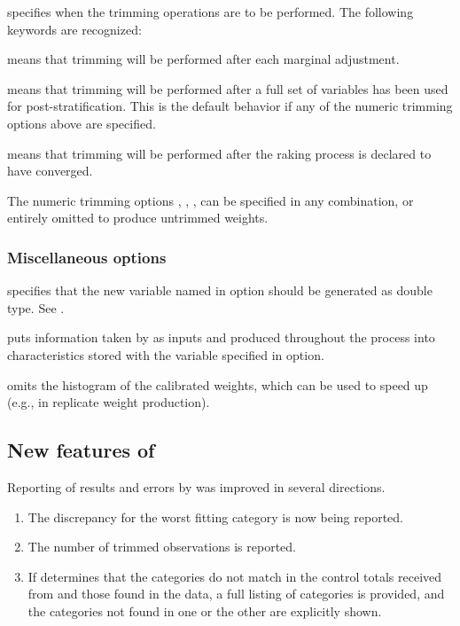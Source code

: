 \hangpara
{} specifies when the trimming operations
    are to be performed. The following keywords are recognized:

\morehang {} means that trimming will be performed
    after each marginal adjustment.

\morehang {} means that trimming will be performed
    after a full set of variables has been used for post-stratification.
    This is the default behavior if any of the numeric trimming
    options above are specified.

\morehang {}
    means that trimming will be performed after the raking process
    is declared to have converged.

The numeric trimming options , ,
,  can be specified in any combination,
or entirely omitted to produce untrimmed weights.

\subsubsection{Miscellaneous options}

\hangpara
{} specifies that the new variable named in 
option should be generated as double type. See .

\hangpara
{} puts information taken by  as inputs and produced
    throughout the process into characteristics stored with the variable specified in
     option.

\hangpara
{} omits the histogram of the calibrated weights, which can be
used to speed up  (e.g., in replicate weight production).

\subsection{New features of }
\label{subsec:example:meta}

Reporting of results and errors by  was improved in several directions.
\begin{enumerate}
    \item The discrepancy for the worst fitting category is now being reported.
    \item The number of trimmed observations is reported.
    \item If  determines that the categories do not match
        in the control totals received from  and those found in
        the data, a full listing of categories is provided, and the categories
        not found in one or the other are explicitly shown.
\end{enumerate}

